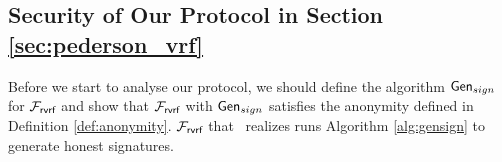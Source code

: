 %		
%	
%	
%

\subsection{Security of Our Protocol in Section \ref{sec:pederson_vrf}}

Before we start to analyse our protocol, we should define the algorithm $ \mathsf{Gen}_{sign} $  for $ \mathcal{F}_{\textsf{rvrf}} $ and show that $ \mathcal{F}_{\textsf{rvrf}} $ with $ \mathsf{Gen}_{sign} $ satisfies the anonymity defined in Definition \ref{def:anonymity}. $ \mathcal{F}_{\textsf{rvrf}} $ that \name \ realizes runs  Algorithm \ref{alg:gensign} to generate honest signatures.



